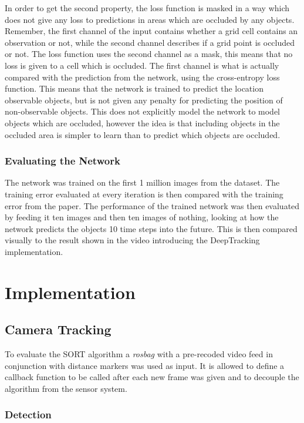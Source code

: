 \documentclass[a4paper]{article}
\begin{document}
In order to get the second property, the loss function is masked in a way which does not give any loss to predictions in areas which are occluded by any objects.
Remember, the first channel of the input contains whether a grid cell contains an observation or not, while the second channel describes if a grid point is occluded or not.
The loss function uses the second channel as a mask, this means that no loss is given to a cell which is occluded.
The first channel is what is actually compared with the prediction from the network, using the cross-entropy loss function.
This means that the network is trained to predict the location observable objects, but is not given any penalty for predicting the position of non-observable objects.
This does not explicitly model the network to model objects which are occluded, however the idea is that including objects in the occluded area is simpler to learn than to predict which objects are occluded.

\subsubsection{Evaluating the Network}

The network was trained on the first 1 million images from the dataset.
The training error evaluated at every iteration is then compared with the training error from the paper.
The performance of the trained network was then evaluated by feeding it ten images and then ten images of nothing, looking at how the network predicts the objects 10 time steps into the future.
This is then compared visually to the result shown in the video introducing the DeepTracking implementation.

\section{Implementation}

\subsection{Camera Tracking}

To evaluate the SORT algorithm a \emph{rosbag} with a pre-recoded video feed in conjunction with distance markers was used as input.  
It is allowed to define a callback function to be called after each new frame was given and to decouple the algorithm from the sensor system.

\subsubsection{Detection}
\end{document}
